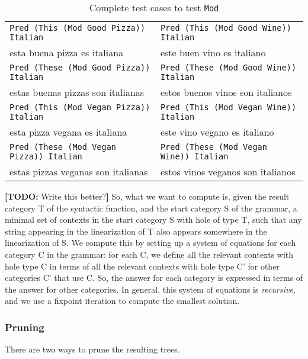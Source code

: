 \documentclass[runningheads]{llncs}
\def\t#1{\texttt{#1}}
\newcommand{\todo}[1]{{\color{cyan}\textbf{[TODO: }#1\textbf{]}}}
\begin{document}
\begin{table}
\caption{Complete test cases to test \t{Mod}}
\label{tab:testCases}
\centering
\begin{tabular}{| l | l |}
\hline
\t{Pred (This (Mod Good Pizza)) Italian} & \t{Pred (This (Mod Good Wine))
                                        Italian} \\ 
esta buena pizza es italiana          & este buen vino es italiano \\ \hline
\t{Pred (These (Mod Good Pizza)) Italian} & \t{Pred (These (Mod Good Wine))
                                        Italian} \\ 
estas buenas pizzas son italianas          & estos buenos vinos son italianos \\ \hline
\t{Pred (This (Mod Vegan Pizza)) Italian} & \t{Pred (This (Mod Vegan Wine))
                                        Italian} \\ 
esta pizza vegana es italiana          & este vino vegano es italiano \\ \hline
\t{Pred (These (Mod Vegan Pizza)) Italian} & \t{Pred (These (Mod Vegan Wine))
                                        Italian} \\ 
estas pizzas veganas son italianas          & estos vinos veganos son italianos \\ \hline
\end{tabular}
\end{table}

\todo{Write this better?} So, what we want to compute is, given the result category T of the syntactic function, and the start category S of the grammar, a minimal set of contexts in the start category S with hole of type T, such that any string appearing in the linearization of T also appears somewhere in the linearization of S. We compute this by setting up a system of equations for each category C in the grammar: for each C, we define all the relevant contexts with hole type C in terms of all the relevant contexts with hole type C' for other categories C' that use C. So, the answer for each category is expressed in terms of the answer for other categories. In general, this system of equations is \emph{recursive}, and we use a fixpoint iteration to compute the smallest solution.

\subsubsection{Pruning} 
There are two ways to prune the resulting trees.
\end{document}

